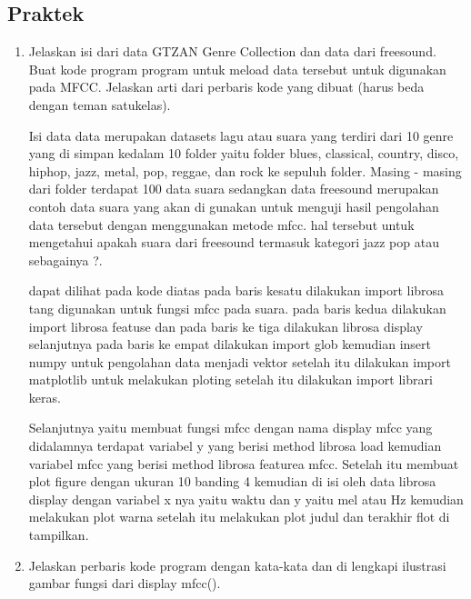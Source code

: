 \subsection{Praktek}
\begin{enumerate}
    \item Jelaskan isi dari data GTZAN Genre Collection dan data dari freesound. Buat kode program program untuk meload data tersebut untuk digunakan pada MFCC. Jelaskan arti dari perbaris kode yang dibuat (harus beda dengan teman satukelas).\par
    \subitem Isi data data merupakan datasets lagu atau suara yang terdiri dari 10 genre yang di simpan kedalam 10 folder yaitu folder blues, classical, country, disco, hiphop, jazz, metal, pop, reggae, dan rock ke sepuluh folder. Masing - masing dari folder terdapat 100 data suara sedangkan data freesound merupakan contoh data suara yang akan di gunakan untuk menguji hasil pengolahan data tersebut dengan menggunakan metode mfcc. hal tersebut untuk mengetahui apakah suara dari freesound termasuk kategori jazz pop atau sebagainya ?.
    
    
    \subitem dapat dilihat pada kode diatas pada baris kesatu dilakukan import librosa tang digunakan untuk fungsi mfcc pada suara.
    pada baris kedua dilakukan import librosa featuse dan pada baris ke tiga dilakukan librosa display selanjutnya pada baris ke empat dilakukan import glob kemudian insert numpy untuk pengolahan data menjadi vektor setelah itu dilakukan import matplotlib untuk melakukan ploting setelah itu dilakukan import librari keras.\par
    
    \subitem Selanjutnya yaitu membuat fungsi mfcc dengan nama display mfcc yang didalamnya terdapat variabel y yang berisi method librosa load kemudian variabel mfcc yang berisi method librosa featurea mfcc. Setelah itu membuat plot figure dengan ukuran 10 banding 4 kemudian di isi oleh data librosa display dengan variabel x nya yaitu waktu dan y yaitu mel atau Hz kemudian melakukan plot warna setelah itu melakukan plot judul dan terakhir flot di tampilkan. 
    
    \item Jelaskan perbaris kode program dengan kata-kata dan di lengkapi ilustrasi gambar fungsi dari display mfcc().\par
    
    
    

\end{enumerate}
